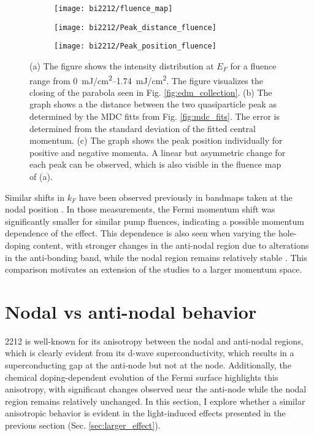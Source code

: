 \begin{figure}[t]
	\centering
	\begin{subfigure}[b]{0.25\textwidth}
		\texttt{[image: bi2212/fluence\_map]}
		\caption{}
	\end{subfigure}
	\begin{subfigure}[b]{0.35\textwidth}
		\texttt{[image: bi2212/Peak\_distance\_fluence]}
		\caption{}
	\end{subfigure}
	\begin{subfigure}[b]{0.35\textwidth}
		\texttt{[image: bi2212/Peak\_position\_fluence]}
		\caption{}
	\end{subfigure}
	\caption{(a) The figure shows the intensity distribution at $E_F$ for a fluence range from \qtyrange{0}{1.74}{\milli\joule/\centi\meter\squared}. The figure visualizes the closing of the parabola seen in Fig. \ref{fig:edm_collection}. (b) The graph shows a the distance between the two quasiparticle peak as determined by the MDC fitts from Fig. \ref{fig:mdc_fits}. The error is determined from the standard deviation of the fitted central momentum. (c) The graph shows the peak position individually for positive and negative momenta. A linear but asymmetric change for each peak can be observed, which is also visible in the fluence map of (a).}
	\label{fig:fluence_map}
\end{figure}

Similar shifts in $k_F$ have been observed previously in bandmaps taken at the nodal position \cite{rameau_photoinduced_2014}.
In those measurements, the Fermi momentum shift was significantly smaller for similar pump fluences, indicating a possible momentum dependence of the effect.
This dependence is also seen when varying the hole-doping content, with stronger changes in the anti-nodal region due to alterations in the anti-bonding band, while the nodal region remains relatively stable \cite{drozdov_phase_2018}.
This comparison motivates an extension of the studies to a larger momentum space.

\section{Nodal vs anti-nodal behavior}
\label{sec:angle}

2212 is well-known for its anisotropy between the nodal and anti-nodal regions, which is clearly evident from its d-wave superconductivity, which results in a superconducting gap at the anti-node but not at the node.
Additionally, the chemical doping-dependent evolution of the Fermi surface highlights this anisotropy, with significant changes observed near the anti-node while the nodal region remains relatively unchanged.
In this section, I explore whether a similar anisotropic behavior is evident in the light-induced effects presented in the previous section (Sec. \ref{sec:larger_effect}).

